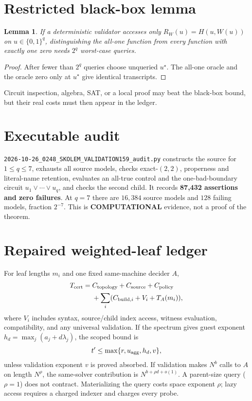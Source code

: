 \documentclass[11pt]{article}
\newtheorem{lemma}[theorem]{Lemma}
\newcommand{\status}[1]{\textbf{#1}}
\begin{document}
\section*{Restricted black-box lemma}
\begin{lemma}
If a deterministic validator accesses only
$R_W(u)=H(u,W(u))$ on $u\in\{0,1\}^q$, distinguishing the all-one function
from every function with exactly one zero needs $2^q$ worst-case queries.
\end{lemma}
\begin{proof}
After fewer than $2^q$ queries choose unqueried $u^\star$.  The all-one oracle
and the oracle zero only at $u^\star$ give identical transcripts.
\end{proof}
Circuit inspection, algebra, SAT, or a local proof may beat the black-box bound,
but their real costs must then appear in the ledger.

\section*{Executable audit}
\texttt{2026-10-26\_0248\_SKOLEM\_VALIDATION159\_audit.py} constructs the
source for $1\le q\le7$, exhausts all source models, checks exact-$(2,2)$,
properness and literal-name retention, evaluates an all-true control and the
one-bad-boundary circuit $u_1\vee\cdots\vee u_q$, and checks the second child.
It records \textbf{87,432 assertions and zero failures}.  At $q=7$ there are
$16,384$ source models and $128$ failing models, fraction $2^{-7}$.  This is
\status{COMPUTATIONAL} evidence, not a proof of the theorem.

\section*{Repaired weighted-leaf ledger}
For leaf lengths $m_i$ and one fixed same-machine decider $A$,
\[
\begin{split}
T_{\rm cert}={}&C_{\rm topology}+C_{\rm source}+C_{\rm policy}\\
&+\sum_i(C_{{\rm build},i}+V_i+T_A(m_i)),
\end{split}
\]
where $V_i$ includes syntax, source/child index access, witness evaluation,
compatibility, and any universal validation.  If the spectrum gives guest
exponent $h_d=\max_j(a_j+d\lambda_j)$, the scoped bound is
\[t'\le\max\{r,u_{\rm agg},h_d,v\},\]
unless validation exponent $v$ is proved absorbed.  If validation makes
$N^b$ calls to $A$ on length $N^\rho$, the same-solver contribution is
$N^{b+\rho d+o(1)}$.  A parent-size query ($\rho=1$) does not contract.
Materializing the query costs space exponent $\rho$; lazy access requires a
charged indexer and charges every probe.
\end{document}
